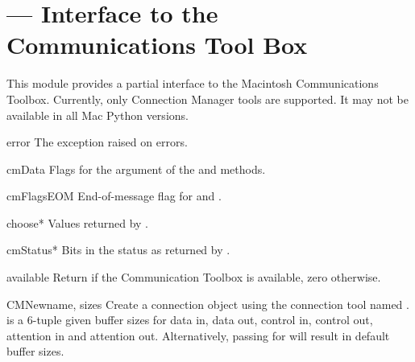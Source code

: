 \section{ ---
         Interface to the Communications Tool Box}



This module provides a partial interface to the Macintosh
Communications Toolbox. Currently, only Connection Manager tools are
supported.  It may not be available in all Mac Python versions.

\begin{datadesc}{error}
The exception raised on errors.
\end{datadesc}

\begin{datadesc}{cmData}
Flags for the  argument of the  and
 methods.
\end{datadesc}

\begin{datadesc}{cmFlagsEOM}
End-of-message flag for  and .
\end{datadesc}

\begin{datadesc}{choose*}
Values returned by .
\end{datadesc}

\begin{datadesc}{cmStatus*}
Bits in the status as returned by .
\end{datadesc}

\begin{funcdesc}{available}{}
Return  if the Communication Toolbox is available, zero otherwise.
\end{funcdesc}

\begin{funcdesc}{CMNew}{name, sizes}
Create a connection object using the connection tool named
.  is a 6-tuple given buffer sizes for data in,
data out, control in, control out, attention in and attention out.
Alternatively, passing  for  will result in
default buffer sizes.
\end{funcdesc}


